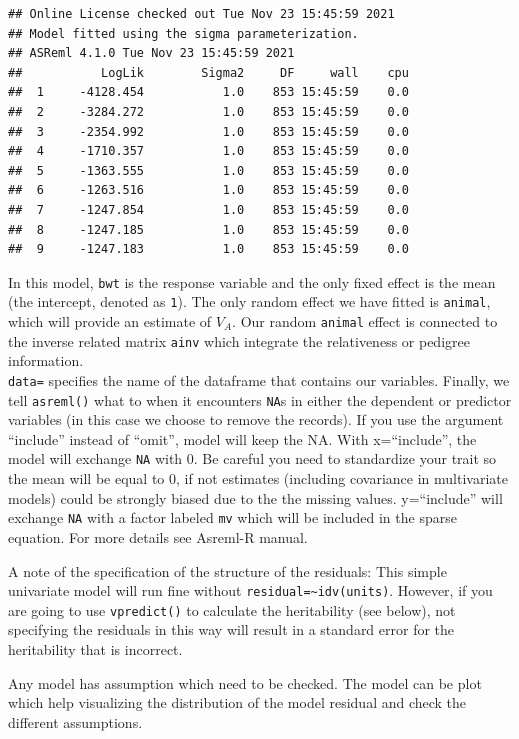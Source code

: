 \documentclass[
  12pt,
]{book}
\begin{document}
\begin{verbatim}
## Online License checked out Tue Nov 23 15:45:59 2021
## Model fitted using the sigma parameterization.
## ASReml 4.1.0 Tue Nov 23 15:45:59 2021
##           LogLik        Sigma2     DF     wall    cpu
##  1     -4128.454           1.0    853 15:45:59    0.0
##  2     -3284.272           1.0    853 15:45:59    0.0
##  3     -2354.992           1.0    853 15:45:59    0.0
##  4     -1710.357           1.0    853 15:45:59    0.0
##  5     -1363.555           1.0    853 15:45:59    0.0
##  6     -1263.516           1.0    853 15:45:59    0.0
##  7     -1247.854           1.0    853 15:45:59    0.0
##  8     -1247.185           1.0    853 15:45:59    0.0
##  9     -1247.183           1.0    853 15:45:59    0.0
\end{verbatim}

In this model, \texttt{bwt} is the response variable and the only fixed effect is the mean (the intercept, denoted as \texttt{1}). The only random effect we have fitted is \texttt{animal}, which will provide an estimate of \(V_A\). Our random \texttt{animal} effect is connected to the inverse related matrix \texttt{ainv} which integrate the relativeness or pedigree information.\\
\texttt{data=} specifies the name of the dataframe that contains our variables. Finally, we tell \texttt{asreml()} what to when it encounters \texttt{NA}s in either the dependent or predictor variables (in this case we choose to remove the records). If you use the argument ``include'' instead of ``omit'', model will keep the NA. With x=``include'', the model will exchange \texttt{NA} with 0. Be careful you need to standardize your trait so the mean will be equal to 0, if not estimates (including covariance in multivariate models) could be strongly biased due to the the missing values. y=``include'' will exchange \texttt{NA} with a factor labeled \texttt{mv} which will be included in the sparse equation. For more details see Asreml-R manual.

A note of the specification of the structure of the residuals: This simple univariate model will run fine without \texttt{residual=\textasciitilde{}idv(units)}. However, if you are going to use \texttt{vpredict()} to calculate the heritability (see below), not specifying the residuals in this way will result in a standard error for the heritability that is incorrect.

Any model has assumption which need to be checked. The model can be plot which help visualizing the distribution of the model residual and check the different assumptions.
\end{document}
